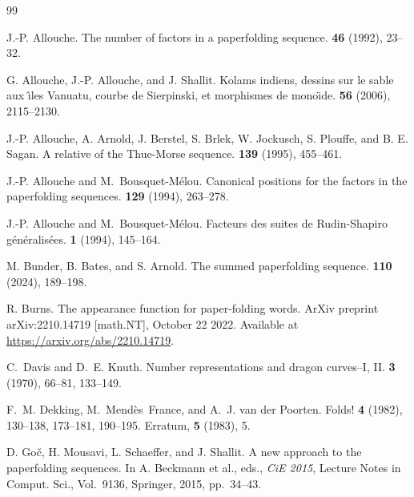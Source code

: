 \documentclass[12pt,reqno]{article}
\begin{document}
\begin{thebibliography}{99}

J.-P. Allouche.
\newblock The number of factors in a paperfolding sequence.
 {\bf 46} (1992), 23--32.

G. Allouche, J.-P. Allouche, and J. Shallit.
\newblock Kolams indiens, dessins sur le sable
aux \^{\i}les Vanuatu, courbe de Sierpinski,
et morphismes de mono\"{\i}de.
 {\bf 56} (2006), 2115--2130.

J.-P. Allouche, A. Arnold, J. Berstel, S. Brlek,
W. Jockusch, S. Plouffe, and B. E. Sagan.
\newblock A relative of the Thue-Morse sequence.
 {\bf 139} (1995), 455--461.

J.-P. Allouche and M.~Bousquet-M\'elou.
\newblock Canonical positions for the factors in the paperfolding sequences.
 {\bf 129} (1994),
  263--278.

J.-P. Allouche and M.~Bousquet-M\'elou.
\newblock Facteurs des suites de {Rudin-Shapiro} g\'en\'eralis\'ees.
 {\bf 1} (1994), 145--164.

M. Bunder, B. Bates, and S. Arnold.
\newblock The summed paperfolding sequence.
 {\bf 110} (2024), 189--198.

R. Burns.
\newblock The appearance function for paper-folding words.
\newblock ArXiv preprint 	arXiv:2210.14719 [math.NT], October 22 2022.
\newblock Available at \url{https://arxiv.org/abs/2210.14719}.

C.~Davis and D.~E. Knuth.
\newblock Number representations and dragon curves--{I, II}.
 {\bf 3} (1970), 66--81, 133--149.

F.~M. Dekking, M.~{Mend\`es}~France, and A.~J. {van der Poorten}.
\newblock Folds!
 {\bf 4} (1982), 130--138, 173--181,
  190--195.
\newblock Erratum, {\bf 5} (1983), 5.

D. Go\v{c}, H. Mousavi, L. Schaeffer, and J. Shallit.
\newblock A new approach to the paperfolding sequences.
\newblock In A. Beckmann et al., eds., {\it CiE 2015},
Lecture Notes in Comput. Sci., Vol.~9136, Springer, 2015, pp.~34--43.


\end{thebibliography}
\end{document}
